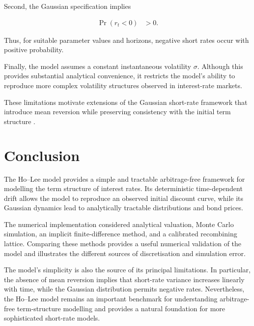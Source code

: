 \documentclass[11pt,a4paper]{article}
\numberwithin{equation}{section}
\begin{document}
Second, the Gaussian specification implies

\begin{align*}
    \Pr(r_t<0)
    &>
    0.
\end{align*}

Thus, for suitable parameter values and horizons, negative short rates
occur with positive probability.

Finally, the model assumes a constant instantaneous volatility $\sigma$.
Although this provides substantial analytical convenience, it restricts
the model's ability to reproduce more complex volatility structures
observed in interest-rate markets.

These limitations motivate extensions of the Gaussian short-rate
framework that introduce mean reversion while preserving consistency
with the initial term structure \citep{BrigoMercurio2006}.


\section{Conclusion}

The Ho--Lee model provides a simple and tractable arbitrage-free framework
for modelling the term structure of interest rates. Its deterministic
time-dependent drift allows the model to reproduce an observed initial
discount curve, while its Gaussian dynamics lead to analytically
tractable distributions and bond prices.

The numerical implementation considered analytical valuation, Monte
Carlo simulation, an implicit finite-difference method, and a calibrated
recombining lattice. Comparing these methods provides a useful numerical
validation of the model and illustrates the different sources of
discretisation and simulation error.

The model's simplicity is also the source of its principal limitations.
In particular, the absence of mean reversion implies that short-rate
variance increases linearly with time, while the Gaussian distribution
permits negative rates. Nevertheless, the Ho--Lee model remains an
important benchmark for understanding arbitrage-free term-structure
modelling and provides a natural foundation for more sophisticated
short-rate models.





\end{document}
